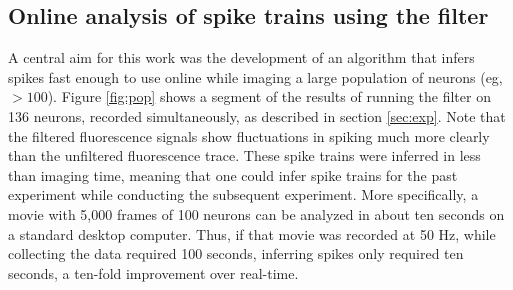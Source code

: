 




\subsection{Online analysis of spike trains using the \foopsi filter}

A central aim for this work was the development of an algorithm that infers spikes fast enough to use online while imaging a large population of neurons (eg, $> 100$).  Figure \ref{fig:pop} shows a segment of the results of running the \foopsi filter on 136 neurons, recorded simultaneously, as described in section \ref{sec:exp}.  Note that the filtered fluorescence signals show fluctuations in spiking much more clearly than the unfiltered fluorescence trace. These spike trains were inferred in less than imaging time, meaning that one could infer spike trains for the past experiment while conducting the subsequent experiment. More specifically, a movie with 5,000 frames of 100 neurons can be analyzed in about ten seconds on a standard desktop computer.  Thus, if that movie was recorded at 50 Hz, while collecting the data required 100 seconds, inferring spikes only required ten seconds, a ten-fold improvement over real-time.  


